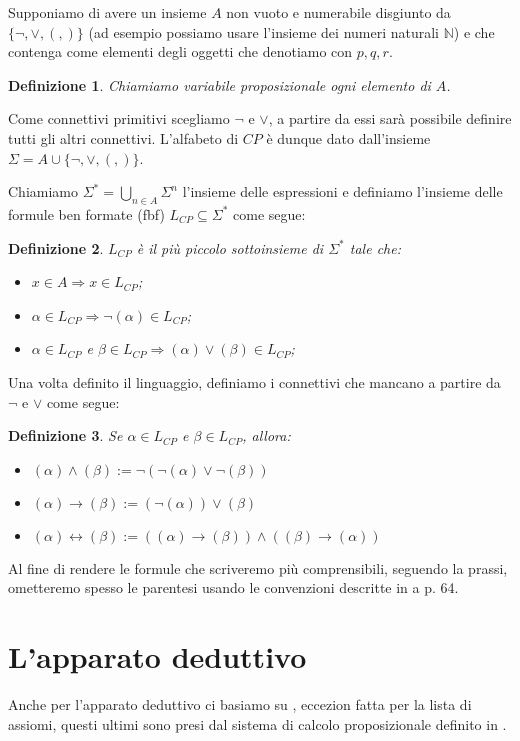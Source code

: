 \documentclass[a4paper, titlepage, 12pt]{report}
\newtheorem{definition}{Definizione}[chapter]
\begin{document}
Supponiamo di avere un insieme $A$ non vuoto e numerabile disgiunto da $\{\neg, \lor, (, )\}$
(ad esempio possiamo usare l'insieme dei numeri naturali $\mathbb{N}$) e che contenga
come elementi degli oggetti che denotiamo con $p, q, r$.

\begin{definition}
Chiamiamo variabile proposizionale ogni elemento di $A$.
\end{definition}

Come connettivi primitivi scegliamo $\neg$ e $\lor$, a partire da essi sarà possibile definire tutti gli altri connettivi.
L'alfabeto di $CP$ è dunque dato dall'insieme $\Sigma = A \cup \{\neg, \lor, (, )\}$.

Chiamiamo $\Sigma^{*} = \bigcup_{n \in A} \Sigma^n$ l'insieme delle espressioni
e definiamo l'insieme delle formule ben formate (fbf) $L_{CP} \subseteq \Sigma^{*}$ come segue:
\begin{definition}
$L_{CP}$ è il più piccolo sottoinsieme di $\Sigma^{*}$ tale che:
\begin{itemize}
\item $x \in A \Rightarrow x \in L_{CP}$;
\item $\alpha \in L_{CP} \Rightarrow \neg (\alpha) \in L_{CP}$;
\item $\alpha \in L_{CP}$ e $\beta \in L_{CP} \Rightarrow (\alpha) \lor (\beta) \in L_{CP}$;
\end{itemize}
\end{definition}

Una volta definito il linguaggio, definiamo i connettivi che mancano a partire da $\neg$ e $\lor$
come segue:
\begin{definition}
Se $\alpha \in L_{CP}$ e $\beta \in L_{CP}$, allora:
\begin{itemize}
\item $(\alpha) \land (\beta) := \neg(\neg(\alpha) \lor \neg(\beta))$
\item $(\alpha) \rightarrow (\beta) := (\neg(\alpha)) \lor (\beta)$
\item $(\alpha) \leftrightarrow (\beta) := ((\alpha) \rightarrow (\beta)) \land ((\beta) \rightarrow (\alpha))$
\end{itemize}
\end{definition}

Al fine di rendere le formule che scriveremo più comprensibili, seguendo la prassi,
ometteremo spesso le parentesi usando le convenzioni descritte in \cite{Tortora} a p. 64.

\section{L'apparato deduttivo}
Anche per l'apparato deduttivo ci basiamo su \cite{IntroModale}, eccezion fatta
per la lista di assiomi,
questi ultimi sono presi dal sistema di calcolo proposizionale definito in \cite{Kleene}.
\end{document}
